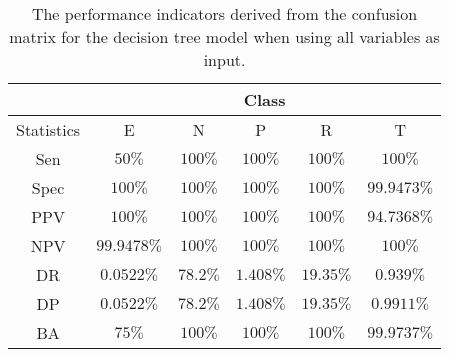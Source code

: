 \begin{table}[!ht]
	\centering
	\begin{tabular}{|c|c|c|c|c|c|}
		\hline
		 & \multicolumn{5}{c|}{Class} \\ \hline
		Statistics & E & N & P & R & T \\ \hline
		Sen & $50\%$ & $100\%$ & $100\%$ & $100\%$ & $100\%$ \\ \hline
		Spec & $100\%$ & $100\%$ & $100\%$ & $100\%$ & $99.9473\%$ \\ \hline
		PPV & $100\%$ & $100\%$ & $100\%$ & $100\%$ & $94.7368\%$ \\ \hline
		NPV & $99.9478\%$ & $100\%$ & $100\%$ & $100\%$ & $100\%$ \\ \hline
		DR & $0.0522\%$ & $78.2\%$ & $1.408\%$ & $19.35\%$ & $0.939\%$ \\ \hline
		DP & $0.0522\%$ & $78.2\%$ & $1.408\%$ & $19.35\%$ & $0.9911\%$ \\ \hline
		BA & $75\%$ & $100\%$ & $100\%$ & $100\%$ & $99.9737\%$ \\ \hline
	\end{tabular}
	\caption{The performance indicators derived from the confusion matrix for the decision tree model when using all variables as input.}
	\label{tab:cs:reverse:all:C5.0}
\end{table}
